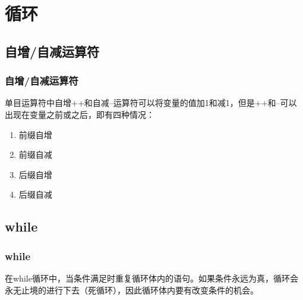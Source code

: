 \chapter{循环}

\section{自增/自减运算符}

\subsection{自增/自减运算符}

单目运算符中自增++和自减--运算符可以将变量的值加1和减1，但是++和--可以出现在变量之前或之后，即有四种情况：

\begin{enumerate}
	\item 前缀自增
	\item 前缀自减
	\item 后缀自增
	\item 后缀自减
\end{enumerate}

\begin{table}[H]
	\centering
	\caption{自增/自减运算符}
\end{table}

\newpage

\section{while}

\subsection{while}

在while循环中，当条件满足时重复循环体内的语句。如果条件永远为真，循环会永无止境的进行下去（死循环），因此循环体内要有改变条件的机会。\\


